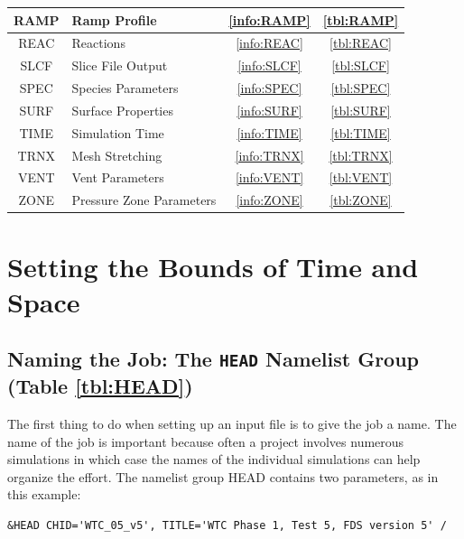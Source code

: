 \documentclass[11pt]{book}
\begin{document}
\begin{table}[ht]
\begin{center}
\begin{tabular}{|c|l|c|c|}
{\ct RAMP}  & Ramp Profile                 & \ref{info:RAMP} & \ref{tbl:RAMP}  \\ \hline
{\ct REAC}  & Reactions                    & \ref{info:REAC} & \ref{tbl:REAC}  \\ \hline
{\ct SLCF}  & Slice File Output            & \ref{info:SLCF} & \ref{tbl:SLCF}  \\ \hline
{\ct SPEC}  & Species Parameters           & \ref{info:SPEC} & \ref{tbl:SPEC}  \\ \hline
{\ct SURF}  & Surface Properties           & \ref{info:SURF} & \ref{tbl:SURF}  \\ \hline
{\ct TIME}  & Simulation Time              & \ref{info:TIME} & \ref{tbl:TIME}  \\ \hline
{\ct TRNX}  & Mesh Stretching              & \ref{info:TRNX} & \ref{tbl:TRNX}  \\ \hline
{\ct VENT}  & Vent Parameters              & \ref{info:VENT} & \ref{tbl:VENT}  \\ \hline
{\ct ZONE}  & Pressure Zone Parameters     & \ref{info:ZONE} & \ref{tbl:ZONE}  \\ \hline
\end{tabular}
\end{center}
\end{table}




\clearpage

\chapter{Setting the Bounds of Time and Space}


\section{Naming the Job: The \texorpdfstring{{\tt HEAD}}{HEAD} Namelist Group (Table \ref{tbl:HEAD})}
\label{info:HEAD}

The first thing to do when setting up an input file is to give the
job a name.  The name of the job is important because often a project
involves numerous simulations in which case the names of the individual
simulations can help organize the effort.  The namelist group {\ct HEAD} contains
two parameters, as in this example:

\footnotesize
\begin{verbatim}
&HEAD CHID='WTC_05_v5', TITLE='WTC Phase 1, Test 5, FDS version 5' /
\end{verbatim}
\normalsize
\end{document}
